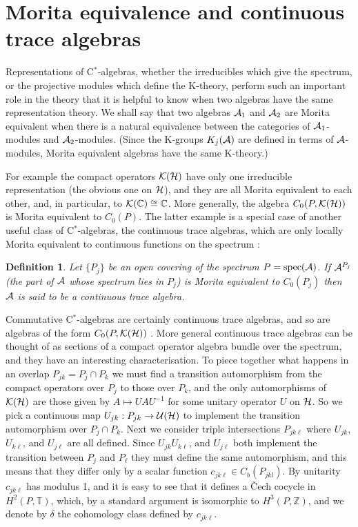 \documentclass[11pt]{article}
\newcommand{\spec}{{\rm spec}}
\newcommand{\complex}{{\mathbb C}}
\newcommand{\torus}{{\mathbb T}}
\newcommand{\integer}{{\mathbb Z}}
\newcommand{\alg}{{\cal A}}
\newcommand{\hilb}{{\cal H}}
\newcommand{\cU}{{\cal U}}
\newcommand{\cpt}{{\cal K}}
\newtheorem{definition}[theorem]{Definition}
\begin{document}
%
%

\section{Morita equivalence and continuous trace algebras}

Representations of C$^*$-algebras, whether the irreducibles which give the spectrum, or the projective modules which define the K-theory,  perform such  an important role in the theory that it is helpful to know when two algebras have the same representation theory. We shall say that 
two algebras
$\alg_1$ and $\alg_2$ are Morita equivalent when there is a natural equivalence between the categories of $\alg_1$-modules and $\alg_2$-modules. 
(Since the K-groups $K_j(\alg)$ are defined  in terms of $\alg$-modules, Morita equivalent algebras have the same K-theory.)

For example the compact operators $\cpt(\hilb)$ have only one irreducible representation (the obvious one on $\hilb$), and they are all Morita equivalent to each other, and, in particular, to $\cpt(\complex) \cong \complex$. 
More generally, the algebra $C_0(P,\cpt(\hilb))$ is Morita equivalent to $C_0(P)$.
The latter example is a special case of another useful class of C$^*$-algebras, the continuous trace algebras, which are only locally Morita equivalent to continuous functions on the spectrum \cite{RW}: 

\begin{definition}
Let $\{P_j\}$ be an open covering of the spectrum $P = \spec(\alg)$. If $\alg^{P_j}$ (the part of $\alg$ whose spectrum lies in $P_j$) is Morita equivalent to $C_0(P_j)$ then $\alg$ is said to be a {\em continuous trace algebra}. 
\end{definition}

Commutative C$^*$-algebras are certainly continuous trace algebras, and so are algebras of the form 
$C_0(P,\cpt(\hilb))$ . More general continuous trace algebras can be thought of as sections of a compact operator algebra bundle over the spectrum, and they have an interesting characterisation.
To piece together what happens in an overlap $P_{jk} = P_j\cap P_k$ we must find a transition automorphism from the compact operators over $P_j$ to those over $P_k$, and the only automorphisms of $\cpt(\hilb)$ are those given by $A \mapsto UAU^{-1}$ for some unitary operator $U$ on $\hilb$. So we pick a continuous map $U_{jk}:P_{jk} \to \cU(\hilb)$ to implement the transition automorphism over $P_j\cap P_k$. Next we consider triple intersections $P_{jk\ell}$ where $U_{jk}$, $U_{k\ell}$, and  $U_{j\ell}$ are all defined. Since $U_{jk}U_{k\ell}$, and  $U_{j\ell}$ both implement the transition between $P_j$ and $P_\ell$ they must define  the same automorphism, and this means that they differ only by a scalar function $c_{jk\ell}\in C_b(P_{jkl})$. By unitarity $c_{jk\ell}$ has modulus 1, and it is easy to see that it defines a \v{C}ech cocycle in $H^2(P,\torus)$, which, by a standard argument is isomorphic to 
$H^3(P, \integer)$, and we denote by $\delta$ the cohomology class defined by $c_{jk\ell}$.
\end{document}
